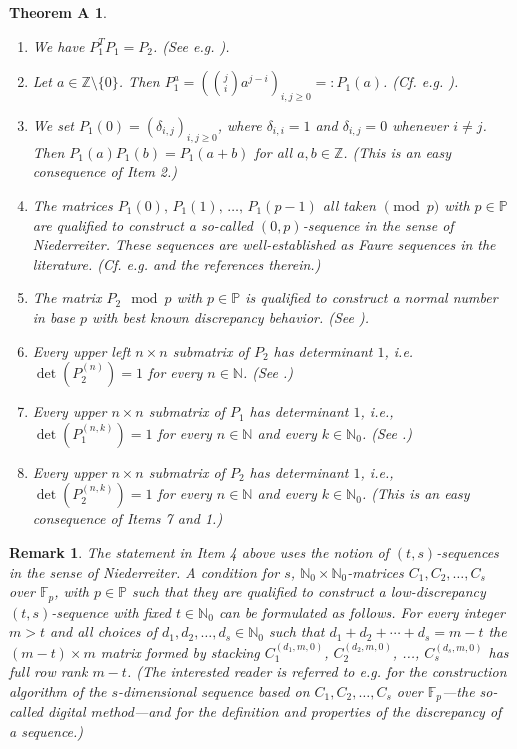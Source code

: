 \documentclass{article}
\newcommand{\PP}{\mathbb P}
\newcommand{\NN}{\mathbb N}
\newcommand{\ZZ}{\mathbb Z}
\newcommand{\FF}{\mathbb F}
\newtheorem*{theoremA}{Theorem A}
\newtheorem{remark}{Remark}
\begin{document}
\begin{theoremA}
\begin{enumerate}
	\item We have $P_1^TP_1=P_2$.
	(See e.g. \cite[Equ.~(6)]{Lunnon}). 
	\item Let $a\in\ZZ\setminus\{0\}$. Then $P_1^{a}=(\binom{j}{i}a^{j-i})_{i,j\geq 0}=:P_1(a)$. (Cf. e.g. \cite[Proposition~2]{hoflarAA}).
	\item We set $P_1(0)=(\delta_{i,j})_{i,j\geq 0}$, where $\delta_{i,i}=1$ and $\delta_{i,j}=0$ whenever $i\neq j$. Then $P_1(a)P_1(b)=P_1(a+b)$ for all $a,b\in\ZZ$. (This is an easy consequence of Item 2.)
	\item The matrices $P_1(0),\,P_1(1),\,\ldots,\,P_1(p-1)$ all taken $\pmod{p}$ with $p\in\PP$ are qualified to construct a so-called $(0,p)$-sequence in the sense of Niederreiter. These sequences are well-established as Faure sequences in the literature.  (Cf. e.g. \cite[Example~2]{hoflarAA} and the references therein.) %
	\item The matrix $P_2\mod{p}$ with $p\in\PP$ is qualified to construct a normal number in base $p$ with best known discrepancy behavior. (See \cite{hoflarNN1,hoflarNN2,levin99}). 
	\item Every upper left $n\times n$ submatrix of $P_2$ has determinant $1$, i.e. $\det(P_2^{(n)})=1$ for every $n\in\NN$. (See \cite[Theorem 1.2]{bickhogg}.)
	\item Every upper $n\times n$ submatrix of $P_1$ has determinant $1$, i.e., $\det(P_1^{(n,k)})=1$ for every $n\in\NN$ and every $k\in\NN_0$. (See \cite[Theorem~1.1]{bickhogg}.)
	\item Every upper $n\times n$ submatrix of $P_2$ has determinant $1$, i.e., $\det(P_2^{(n,k)})=1$ for every $n\in\NN$ and every $k\in\NN_0$. (This is an easy consequence of Items 7 and 1.)
	
\end{enumerate}
\end{theoremA}
\begin{remark}{\rm
The statement in Item 4 above uses the notion of $(t,s)$-sequences in the sense of Niederreiter. A condition for $s$, $\NN_0\times\NN_0$-matrices $C_1,C_2,\ldots,C_s$ over $\FF_p$, with $p\in\PP$ such that they are qualified to construct a low-discrepancy $(t,s)$-sequence with fixed $t\in\NN_0$ can be formulated as follows. For every integer $m> t$ and all choices of $d_1,d_2,\ldots,d_s\in\NN_0$ such that $d_1+d_2+\cdots+d_s=m-t$ the $(m-t)\times m$ matrix formed by stacking $C_1^{(d_1,m,0)} $, $C_2^{(d_2,m,0)}$, ..., $C_s^{(d_s,m,0)}$ has full row rank $m-t$. (The interested reader is referred to e.g. \cite{DP} for the construction algorithm of the $s$-dimensional sequence based on $C_1,C_2,\ldots,C_s$ over $\FF_p$---the so-called digital method---and for the definition and properties of the \emph{discrepancy} of a sequence.)}
\end{remark}
\end{document}
